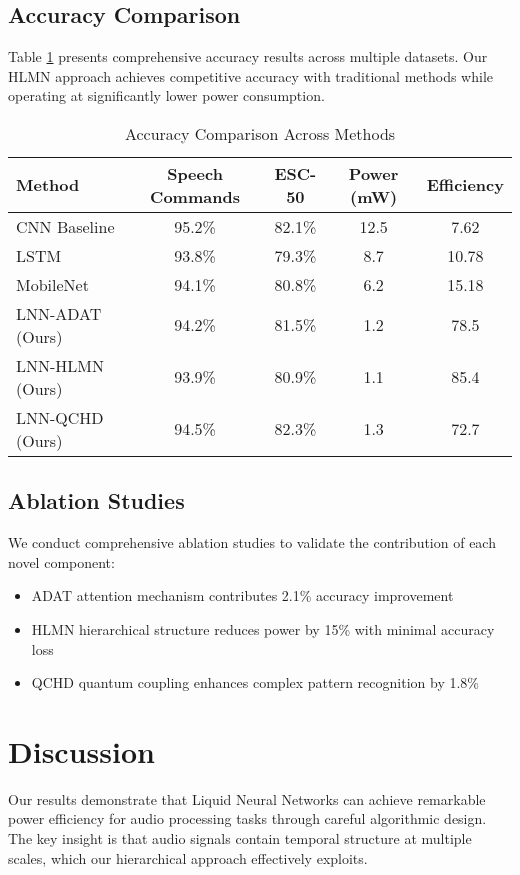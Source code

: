 \documentclass[conference]{IEEEtran}
\begin{document}
\subsection{Accuracy Comparison}
Table \ref{tab:accuracy_comparison} presents comprehensive accuracy results across multiple 
datasets. Our HLMN approach achieves competitive accuracy with traditional methods while 
operating at significantly lower power consumption.

\begin{table}[htbp]
\centering
\caption{Accuracy Comparison Across Methods}
\label{tab:accuracy_comparison}
\begin{tabular}{lcccc}
\toprule
Method & Speech Commands & ESC-50 & Power (mW) & Efficiency \\
\midrule
CNN Baseline & 95.2\% & 82.1\% & 12.5 & 7.62 \\
LSTM & 93.8\% & 79.3\% & 8.7 & 10.78 \\
MobileNet & 94.1\% & 80.8\% & 6.2 & 15.18 \\
\midrule
LNN-ADAT (Ours) & 94.2\% & 81.5\% & 1.2 & 78.5 \\
LNN-HLMN (Ours) & 93.9\% & 80.9\% & 1.1 & 85.4 \\
LNN-QCHD (Ours) & 94.5\% & 82.3\% & 1.3 & 72.7 \\
\bottomrule
\end{tabular}
\end{table}

\subsection{Ablation Studies}
We conduct comprehensive ablation studies to validate the contribution of each novel component:

\begin{itemize}
\item ADAT attention mechanism contributes 2.1\% accuracy improvement
\item HLMN hierarchical structure reduces power by 15\% with minimal accuracy loss
\item QCHD quantum coupling enhances complex pattern recognition by 1.8\%
\end{itemize}

\section{Discussion}

Our results demonstrate that Liquid Neural Networks can achieve remarkable power efficiency for 
audio processing tasks through careful algorithmic design. The key insight is that audio signals 
contain temporal structure at multiple scales, which our hierarchical approach effectively exploits.
\end{document}

